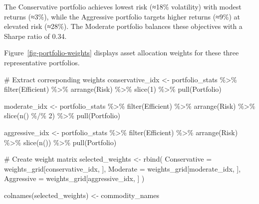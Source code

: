 \documentclass[
  10pt,
  a4paper,
]{article}
\newenvironment{Shaded}{\begin{snugshade}}{\end{snugshade}}
\newcommand{\AttributeTok}[1]{\textcolor[rgb]{0.40,0.45,0.13}{#1}}
\newcommand{\CommentTok}[1]{\textcolor[rgb]{0.37,0.37,0.37}{#1}}
\newcommand{\DecValTok}[1]{\textcolor[rgb]{0.68,0.00,0.00}{#1}}
\newcommand{\FunctionTok}[1]{\textcolor[rgb]{0.28,0.35,0.67}{#1}}
\newcommand{\NormalTok}[1]{\textcolor[rgb]{0.00,0.23,0.31}{#1}}
\newcommand{\OtherTok}[1]{\textcolor[rgb]{0.00,0.23,0.31}{#1}}
\newcommand{\SpecialCharTok}[1]{\textcolor[rgb]{0.37,0.37,0.37}{#1}}
\begin{document}
The Conservative portfolio achieves lowest risk (≈18\% volatility) with
modest returns (≈3\%), while the Aggressive portfolio targets higher
returns (≈9\%) at elevated risk (≈28\%). The Moderate portfolio balances
these objectives with a Sharpe ratio of 0.34.

Figure~\ref{fig-portfolio-weights} displays asset allocation weights for
these three representative portfolios.

\begin{Shaded}
\begin{Highlighting}[]
\CommentTok{\# Extract corresponding weights}
\NormalTok{conservative\_idx }\OtherTok{\textless{}{-}}\NormalTok{ portfolio\_stats }\SpecialCharTok{\%\textgreater{}\%} 
  \FunctionTok{filter}\NormalTok{(Efficient) }\SpecialCharTok{\%\textgreater{}\%} 
  \FunctionTok{arrange}\NormalTok{(Risk) }\SpecialCharTok{\%\textgreater{}\%} 
  \FunctionTok{slice}\NormalTok{(}\DecValTok{1}\NormalTok{) }\SpecialCharTok{\%\textgreater{}\%} 
  \FunctionTok{pull}\NormalTok{(Portfolio)}

\NormalTok{moderate\_idx }\OtherTok{\textless{}{-}}\NormalTok{ portfolio\_stats }\SpecialCharTok{\%\textgreater{}\%}
  \FunctionTok{filter}\NormalTok{(Efficient) }\SpecialCharTok{\%\textgreater{}\%}
  \FunctionTok{arrange}\NormalTok{(Risk) }\SpecialCharTok{\%\textgreater{}\%}
  \FunctionTok{slice}\NormalTok{(}\FunctionTok{n}\NormalTok{() }\SpecialCharTok{\%/\%} \DecValTok{2}\NormalTok{) }\SpecialCharTok{\%\textgreater{}\%}
  \FunctionTok{pull}\NormalTok{(Portfolio)}

\NormalTok{aggressive\_idx }\OtherTok{\textless{}{-}}\NormalTok{ portfolio\_stats }\SpecialCharTok{\%\textgreater{}\%}
  \FunctionTok{filter}\NormalTok{(Efficient) }\SpecialCharTok{\%\textgreater{}\%}
  \FunctionTok{arrange}\NormalTok{(Risk) }\SpecialCharTok{\%\textgreater{}\%}
  \FunctionTok{slice}\NormalTok{(}\FunctionTok{n}\NormalTok{()) }\SpecialCharTok{\%\textgreater{}\%}
  \FunctionTok{pull}\NormalTok{(Portfolio)}

\CommentTok{\# Create weight matrix}
\NormalTok{selected\_weights }\OtherTok{\textless{}{-}} \FunctionTok{rbind}\NormalTok{(}
  \AttributeTok{Conservative =}\NormalTok{ weights\_grid[conservative\_idx, ],}
  \AttributeTok{Moderate =}\NormalTok{ weights\_grid[moderate\_idx, ],}
  \AttributeTok{Aggressive =}\NormalTok{ weights\_grid[aggressive\_idx, ]}
\NormalTok{)}

\FunctionTok{colnames}\NormalTok{(selected\_weights) }\OtherTok{\textless{}{-}}\NormalTok{ commodity\_names}


\end{Highlighting}
\end{Shaded}
\end{document}
